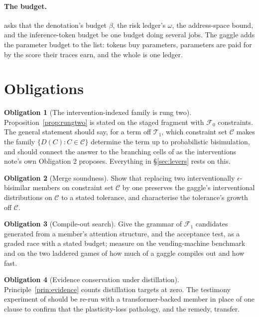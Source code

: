 \documentclass[11pt]{article}
\theoremstyle{plain}
\theoremstyle{definition}
\newtheorem{obligation}{Obligation}
\theoremstyle{remark}
\begin{document}
\paragraph{The budget.} \cite[Rem.~6.5]{GradedV4} asks that the denotation's
budget $\beta$, the risk ledger's $\omega$, the address-space bound, and the
inference-token budget be one budget doing several jobs. The gaggle adds the
parameter budget to the list: tokens buy parameters, parameters are paid for by
the score their traces earn, and the whole is one ledger.

\section{Obligations}\label{sec:obligations}

\begin{obligation}[The intervention-indexed family is rung two]\label{ob:rungtwo}
Proposition~\ref{prop:rungtwo} is stated on the staged fragment with
$\mathcal{F}_0$ constraints. The general statement should say, for a term off
$\mathcal{T}_1$, which constraint set $\mathcal{C}$ makes the family
$\{D(C) : C \in \mathcal{C}\}$ determine the term up to probabilistic
bisimulation, and should connect the answer to the branching cells of
\cite{AbbesBenveniste} as the interventions note's own Obligation 2 proposes.
Everything in \S\ref{sec:levers} rests on this.
\end{obligation}

\begin{obligation}[Merge soundness]
Show that replacing two interventionally $\epsilon$-bisimilar members on
constraint set $\mathcal{C}$ by one preserves the gaggle's interventional
distributions on $\mathcal{C}$ to a stated tolerance, and characterise the
tolerance's growth off $\mathcal{C}$.
\end{obligation}

\begin{obligation}[Compile-out search]
Give the grammar of $\mathcal{F}_1$ candidates generated from a member's
attention structure, and the acceptance test, as a graded race with a stated
budget; measure on the vending-machine benchmark and on the two laddered games
of \cite{Compose} how much of a gaggle compiles out and how fast.
\end{obligation}

\begin{obligation}[Evidence conservation under distillation]
Principle~\ref{prin:evidence} counts distillation targets at zero. The
testimony experiment of \cite[\S11]{GradedPLN} should be re-run with a
transformer-backed member in place of one clause to confirm that the
plasticity-loss pathology, and the remedy, transfer.
\end{obligation}
\end{document}
